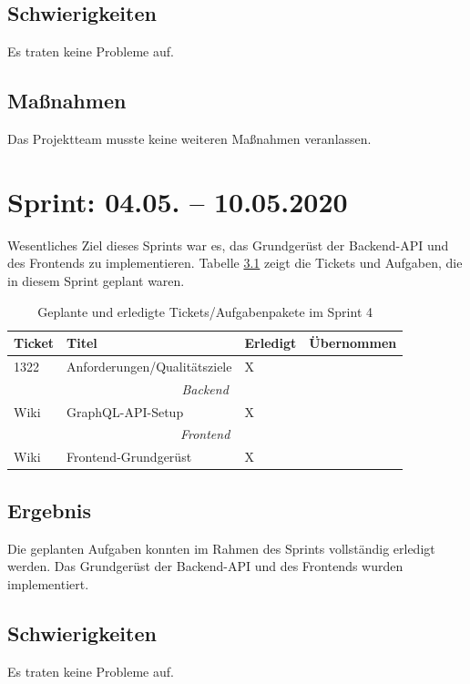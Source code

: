 \documentclass[a4paper,11pt,listof=numbered,glossary=totoc,parskip=half,toc=bib]{scrreprt}
\begin{document}
    \section{Schwierigkeiten}
    Es traten keine Probleme auf. 
    
    \section{Maßnahmen}
    Das Projektteam musste keine weiteren Maßnahmen veranlassen.
    
    \chapter{Sprint: 04.05. – 10.05.2020}

Wesentliches Ziel dieses Sprints war es, das Grundgerüst der Backend-API und des Frontends zu implementieren. Tabelle \ref{tab:sprint4} zeigt die Tickets und Aufgaben, die in diesem Sprint geplant waren.

\begin{table}    
    \begin{tabularx}{\textwidth}{lXll}
			\toprule
			\textbf{Ticket} & \textbf{Titel} & \textbf{Erledigt} & \textbf{Übernommen} \\
			\midrule
			1322	&	Anforderungen/Qualitätsziele	&	X	&		\\
					\midrule
		\multicolumn{4}{c}{\textit{Backend}}\\
		\midrule
Wiki	&	GraphQL-API-Setup	&	X	&		\\
		\midrule
		\multicolumn{4}{c}{\textit{Frontend}}\\
		\midrule
Wiki	&	Frontend-Grundgerüst	&	X	&		\\
			\bottomrule
		\end{tabularx}
\caption{Geplante und erledigte Tickets/Aufgabenpakete im Sprint 4}
\label{tab:sprint4}
\end{table} 
    
    \section{Ergebnis}
    Die geplanten Aufgaben konnten im Rahmen des Sprints vollständig erledigt werden. Das Grundgerüst der Backend-API und des Frontends wurden implementiert.
    
    \section{Schwierigkeiten}
    Es traten keine Probleme auf. 
    
\end{document}
